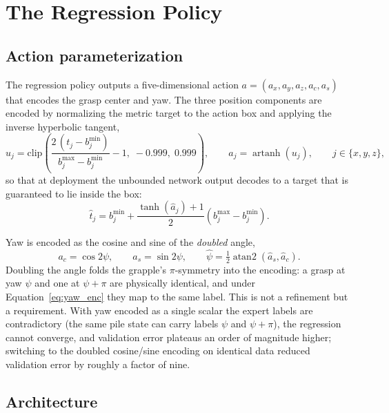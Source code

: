 \section{The Regression Policy}
\label{sec:bc_regression}

\subsection{Action parameterization}
\label{sec:bc_action_param}

The regression policy outputs a five-dimensional action
$a = (a_x, a_y, a_z, a_c, a_s)$ that encodes the grasp center and yaw. The
three position components are encoded by normalizing the metric target to the
action box and applying the inverse hyperbolic tangent,
\begin{equation}
  u_j = \mathrm{clip}\!\left( \frac{2\,(t_j - b^{\min}_j)}{b^{\max}_j - b^{\min}_j} - 1,\;
        -0.999,\; 0.999 \right), \qquad
  a_j = \operatorname{artanh}(u_j), \qquad j \in \{x, y, z\},
  \label{eq:arctanh_enc}
\end{equation}
so that at deployment the unbounded network output decodes to a target that is
guaranteed to lie inside the box:
\begin{equation}
  \hat{t}_j = b^{\min}_j + \frac{\tanh(\hat{a}_j) + 1}{2}
              \left( b^{\max}_j - b^{\min}_j \right).
  \label{eq:arctanh_dec}
\end{equation}

Yaw is encoded as the cosine and sine of the \emph{doubled} angle,
\begin{equation}
  a_c = \cos 2\psi, \qquad a_s = \sin 2\psi, \qquad
  \hat{\psi} = \tfrac{1}{2} \operatorname{atan2}(\hat{a}_s, \hat{a}_c).
  \label{eq:yaw_enc}
\end{equation}
Doubling the angle folds the grapple's $\pi$-symmetry into the encoding: a
grasp at yaw $\psi$ and one at $\psi + \pi$ are physically identical, and
under Equation~\eqref{eq:yaw_enc} they map to the same label. This is not a
refinement but a requirement. With yaw encoded as a single scalar the expert
labels are contradictory (the same pile state can carry labels $\psi$ and
$\psi + \pi$), the regression cannot converge, and validation error plateaus
an order of magnitude higher; switching to the doubled cosine/sine encoding on
identical data reduced validation error by roughly a factor of nine.

\subsection{Architecture}

